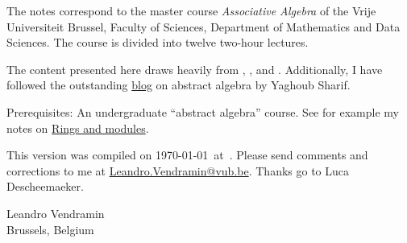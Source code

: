 \preface

The notes correspond to the master  
course \emph{Associative Algebra} of the 
Vrije Universiteit Brussel, 
Faculty of Sciences, 
Department of Mathematics and Data Sciences. The course
is divided into twelve two-hour lectures. 

The content presented here draws heavily from \cite{MR3308118}, \cite{MR1449137}, 
and \cite{MR798076}. Additionally, I have 
followed the outstanding \href{https://ysharifi.wordpress.com}{blog} on 
abstract algebra by Yaghoub Sharif.

Prerequisites: An undergraduate ``abstract algebra'' course. See for example
my notes on \href{https://github.com/vendramin/rings}{Rings and modules}. 

\medskip
This version 
was compiled on \today~at~\currenttime.
Please send comments and corrections to me at \url{Leandro.Vendramin@vub.be}. 
Thanks go to Luca Descheemaeker. 


\bigskip
\begin{flushright}
Leandro Vendramin\\Brussels, Belgium\par
\end{flushright}
